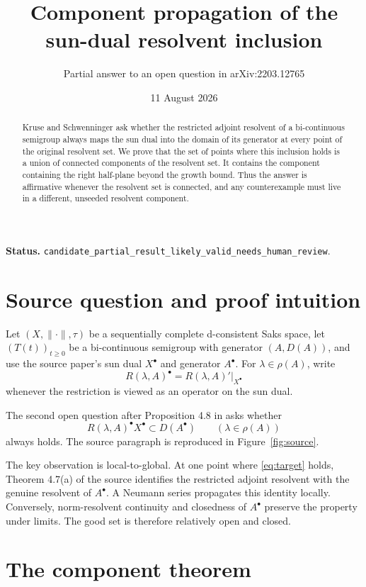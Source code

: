 \documentclass[11pt]{article}
\title{Component propagation of the sun-dual resolvent inclusion}
\author{Partial answer to an open question in arXiv:2203.12765}
\date{11 August 2026}
\begin{document}
\maketitle

\noindent\textbf{Status.}
\texttt{candidate\_partial\_result\_likely\_valid\_needs\_human\_review}.

\begin{abstract}
Kruse and Schwenninger ask whether the restricted adjoint resolvent of a
bi-continuous semigroup always maps the sun dual into the domain of its
generator at every point of the original resolvent set. We prove that the set
of points where this inclusion holds is a union of connected components of
the resolvent set. It contains the component containing the right half-plane
beyond the growth bound. Thus the answer is affirmative whenever the
resolvent set is connected, and any counterexample must live in a different,
unseeded resolvent component.
\end{abstract}

\section{Source question and proof intuition}

Let \((X,\|\cdot\|,\tau)\) be a sequentially complete d-consistent Saks space,
let \((T(t))_{t\geq0}\) be a bi-continuous semigroup with generator
\((A,D(A))\), and use the source paper's sun dual \(X^\bullet\) and generator
\(A^\bullet\). For \(\lambda\in\rho(A)\), write
\[
 R(\lambda,A)^\bullet=R(\lambda,A)'|_{X^\bullet}
\]
whenever the restriction is viewed as an operator on the sun dual.

The second open question after Proposition 4.8 in \cite{source} asks whether
\begin{equation}\label{eq:target}
 R(\lambda,A)^\bullet X^\bullet\subset D(A^\bullet)
 \qquad(\lambda\in\rho(A))
\end{equation}
always holds. The source paragraph is reproduced in
Figure~\ref{fig:source}.

The key observation is local-to-global. At one point where
\eqref{eq:target} holds, Theorem 4.7(a) of the source identifies the restricted
adjoint resolvent with the genuine resolvent of \(A^\bullet\). A Neumann
series propagates this identity locally. Conversely, norm-resolvent
continuity and closedness of \(A^\bullet\) preserve the property under limits.
The good set is therefore relatively open and closed.

\section{The component theorem}
\end{document}
